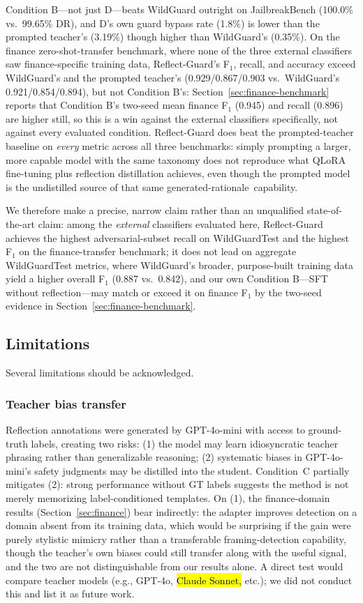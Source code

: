 \documentclass[superintelligence,article,accept,moreauthors]{Definitions/mdpi}
\begin{document}
Condition B---not just D---beats WildGuard outright on JailbreakBench (100.0\% vs.\ 99.65\% DR), and D's own guard bypass rate (1.8\%) is lower than the prompted teacher's (3.19\%) though higher than WildGuard's (0.35\%). On the finance zero-shot-transfer benchmark, where none of the three external classifiers saw finance-specific training data, Reflect-Guard's F$_1$, recall, and accuracy exceed WildGuard's and the prompted teacher's (0.929/0.867/0.903 vs.\ WildGuard's 0.921/0.854/0.894), but not Condition B's: Section~\ref{sec:finance-benchmark} reports that Condition B's two-seed mean finance F$_1$ (0.945) and recall (0.896) are higher still, so this is a win against the external classifiers specifically, not against every evaluated condition. Reflect-Guard does beat the prompted-teacher baseline on \emph{every} metric across all three benchmarks: simply prompting a larger, more capable model with the same taxonomy does not reproduce what QLoRA fine-tuning plus reflection distillation achieves, even though the prompted model is the undistilled source of that same generated-\mbox{rationale capability.}

We therefore make a precise, narrow claim rather than an unqualified state-of-the-art claim: among the \emph{external} classifiers evaluated here, Reflect-Guard achieves the highest adversarial-subset recall on WildGuardTest and the highest F$_1$ on the finance-transfer benchmark; it does not lead on aggregate WildGuardTest metrics, where WildGuard's broader, purpose-built training data yield a higher overall F$_1$ (0.887 vs.\ 0.842), and our own Condition B---SFT without reflection---may match or exceed it on finance F$_1$ by the two-seed evidence in Section~\ref{sec:finance-benchmark}.

\subsection{Limitations}
\label{sec:limitations}

Several limitations should be acknowledged.

\subsubsection{Teacher bias transfer
}
Reflection annotations were generated by GPT-4o-mini with access to ground-truth labels, creating two risks: (1) the model may learn idiosyncratic teacher phrasing rather than generalizable reasoning; (2) systematic biases in GPT-4o-mini's safety judgments may be distilled into the student. Condition~C partially mitigates (2): strong performance without GT labels suggests the method is not merely memorizing label-conditioned templates. On (1), the finance-domain results (Section~\ref{sec:finance}) bear indirectly: the adapter improves detection on a domain absent from its training data, which would be surprising if the gain were purely stylistic mimicry rather than a transferable framing-detection capability, though the teacher's own biases could still transfer along with the useful signal, and the two are not distinguishable from our results alone. A direct test would compare teacher models (e.g., GPT-4o, \hl{Claude Sonnet,}
 etc.); we did not conduct this and list it as future work.
\end{document}
